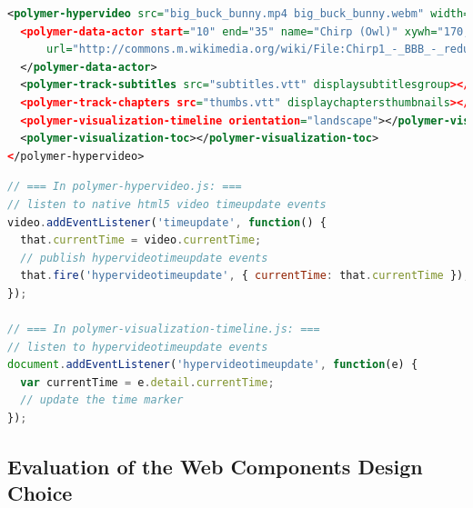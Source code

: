 \documentclass[runningheads,a4paper]{llncs}
\begin{document}
\begin{lstlisting}[caption={Web Components mark-up for the hypervideo in \autoref{fig:screenshot}, including subtitles, chapters, timeline, and table of contents; the actor annotation contains a~spatial fragment
(\texttt{xywh})~\cite{troncy2012mediafragments} and a~link (\texttt{url})
  to Wikimedia Commons},
  label=listing:polymer, language=xml,
  float=htb!, stringstyle=\color{gray},morekeywords={polymer,hypervideo,track,subtitles,chapters,toc,timeline,visualization,data,actor,src,end,start,name,url,width,height,muted,displaysubtitlesgroup,orientation,displaychaptersthumbnails,xywh}]
<polymer-hypervideo src="big_buck_bunny.mp4 big_buck_bunny.webm" width="400" height="225" muted>
  <polymer-data-actor start="10" end="35" name="Chirp (Owl)" xywh="170,20,70,80" 
      url="http://commons.m.wikimedia.org/wiki/File:Chirp1_-_BBB_-_reduced_snapshot.png">
  </polymer-data-actor>
  <polymer-track-subtitles src="subtitles.vtt" displaysubtitlesgroup></polymer-track-subtitles>
  <polymer-track-chapters src="thumbs.vtt" displaychaptersthumbnails></polymer-track-chapters>
  <polymer-visualization-timeline orientation="landscape"></polymer-visualization-timeline>
  <polymer-visualization-toc></polymer-visualization-toc>
</polymer-hypervideo>
\end{lstlisting}

\begin{lstlisting}[caption={Native JavaScript event communication
  between Web Components},
  label=listing:events, language=JavaScript,
  float=htb!, stringstyle=\color{gray},morekeywords={addEventListener,document}]
// === In polymer-hypervideo.js: ===
// listen to native html5 video timeupdate events
video.addEventListener('timeupdate', function() {
  that.currentTime = video.currentTime;
  // publish hypervideotimeupdate events
  that.fire('hypervideotimeupdate', { currentTime: that.currentTime });
});

// === In polymer-visualization-timeline.js: ===
// listen to hypervideotimeupdate events
document.addEventListener('hypervideotimeupdate', function(e) {
  var currentTime = e.detail.currentTime;
  // update the time marker
});
\end{lstlisting}

\subsection{Evaluation of the Web Components Design Choice}
\end{document}
